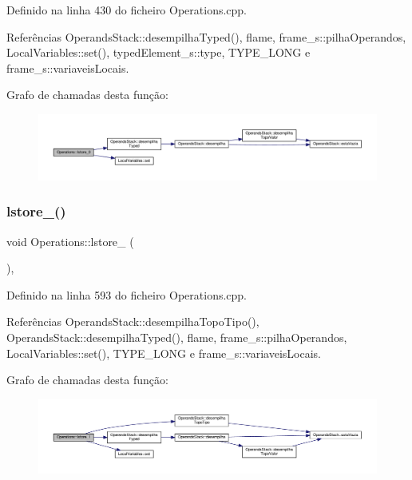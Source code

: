 Definido na linha 430 do ficheiro Operations.\+cpp.



Referências Operands\+Stack\+::desempilha\+Typed(), flame, frame\+\_\+s\+::pilha\+Operandos, Local\+Variables\+::set(), typed\+Element\+\_\+s\+::type, T\+Y\+P\+E\+\_\+\+L\+O\+NG e frame\+\_\+s\+::variaveis\+Locais.

Grafo de chamadas desta função\+:
\nopagebreak
\begin{figure}[H]
\begin{center}
\leavevmode
\includegraphics[width=350pt]{classOperations_ae3c949d56a3ee685668134493595334b_cgraph}
\end{center}
\end{figure}
\mbox{\label{classOperations_aa162cef00367e3d5fb5dca12494a5793}} 
\subsubsection{\texorpdfstring{lstore\+\_()}{lstore\_1()}}
{\footnotesize\ttfamily void Operations\+::lstore\+\_ (\begin{DoxyParamCaption}{ }\end{DoxyParamCaption})\hspace{0.3cm}{\ttfamily [static]}, {\ttfamily [private]}}



Definido na linha 593 do ficheiro Operations.\+cpp.



Referências Operands\+Stack\+::desempilha\+Topo\+Tipo(), Operands\+Stack\+::desempilha\+Typed(), flame, frame\+\_\+s\+::pilha\+Operandos, Local\+Variables\+::set(), T\+Y\+P\+E\+\_\+\+L\+O\+NG e frame\+\_\+s\+::variaveis\+Locais.

Grafo de chamadas desta função\+:
\nopagebreak
\begin{figure}[H]
\begin{center}
\leavevmode
\includegraphics[width=350pt]{classOperations_aa162cef00367e3d5fb5dca12494a5793_cgraph}
\end{center}
\end{figure}
\mbox{\label{classOperations_a178660c2b3ca2625c140daf867531386}} 
